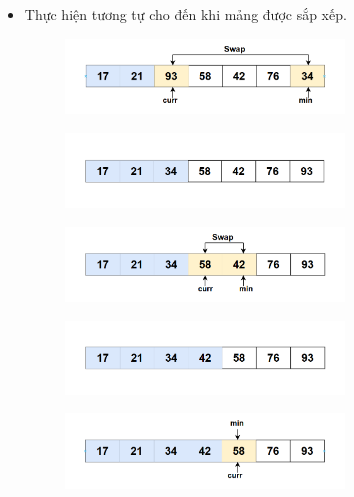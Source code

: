\begin{itemize}
\item  Thực hiện tương tự cho đến khi mảng được sắp xếp.
\begin{figure}[H]
    \centering
    \includegraphics[width=0.7\textwidth]{img/selection sort_suadoi/6.png} 
\end{figure}

\begin{figure}[H]
    \centering
    \includegraphics[width=0.7\textwidth]{img/selection sort_suadoi/7.png} 
\end{figure}

\begin{figure}[H]
    \centering
    \includegraphics[width=0.7\textwidth]{img/selection sort_suadoi/8.png} 
\end{figure}

\begin{figure}[H]
    \centering
    \includegraphics[width=0.7\textwidth]{img/selection sort_suadoi/9.png} 
\end{figure}

\begin{figure}[H]
    \centering
    \includegraphics[width=0.7\textwidth]{img/selection sort_suadoi/10.png} 
\end{figure}


\end{itemize}
